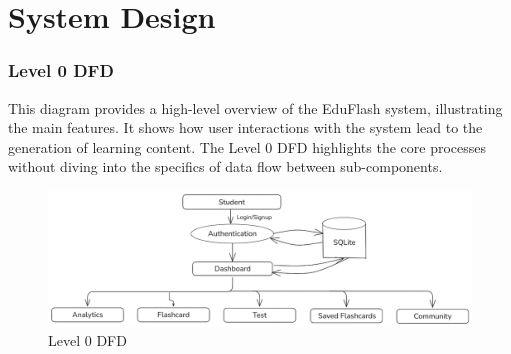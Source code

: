 \documentclass{report}
\begin{document}
\chapter{System Design}

\subsection{Level 0 DFD}
\Large
This diagram provides a high-level overview of the EduFlash system, illustrating the main features. It shows how user interactions with the system lead to the generation of learning content. The Level 0 DFD highlights the core processes without diving into the specifics of data flow between sub-components. \\
\begin{figure}[h]
    \centering
    \includegraphics[width=\textwidth]{DFD 0.png}
    \caption{Level 0 DFD}
\end{figure}
\clearpage

\vspace{-\baselineskip} %

\end{document}

